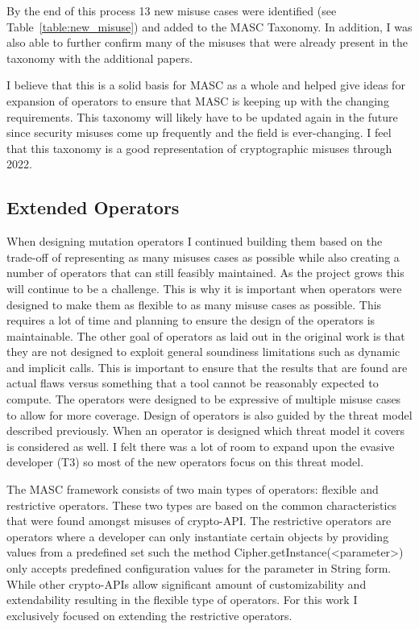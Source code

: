 By the end of this process 13 new misuse cases were identified (see Table~\ref{table:new_misuse}) and added to the MASC Taxonomy. In addition, I was also able to further confirm many of the misuses that were already present in the taxonomy with the additional papers.

I believe that this is a solid basis for MASC as a whole and helped give ideas for expansion of operators to ensure that MASC is keeping up with the changing requirements. This taxonomy will likely have to be updated again in the future since security misuses come up frequently and the field is ever-changing. I feel that this taxonomy is a good representation of cryptographic misuses through 2022.

\subsection{Extended Operators}
\label{ch2:sec:operators}

When designing mutation operators I continued building them based on the trade-off of representing as many misuses cases as possible while also creating a number of operators that can still feasibly maintained. As the project grows this will continue to be a challenge. This is why it is important when operators were designed to make them as flexible to as many misuse cases as possible. This requires a lot of time and planning to ensure the design of the operators is maintainable. The other goal of operators as laid out in the original work is that they are not designed to exploit general soundiness limitations such as dynamic and implicit calls. This is important to ensure that the results that are found are actual flaws versus something that a tool cannot be reasonably expected to compute. The operators were designed to be expressive of multiple misuse cases to allow for more coverage. Design of operators is also guided by the threat model described previously. When an operator is designed which threat model it covers is considered as well. I felt there was a lot of room to expand upon the evasive developer (T3) so most of the new operators focus on this threat model.

The MASC framework consists of two main types of operators: flexible and restrictive operators. These two types are based on the common characteristics that were found amongst misuses of crypto-API. The restrictive operators are operators where a developer can only instantiate certain objects by providing values from a predefined set such the method Cipher.getInstance(<parameter>) only accepts predefined configuration values for the parameter in String form. While other crypto-APIs allow significant amount of customizability and extendability resulting in the flexible type of operators. For this work I exclusively focused on extending the restrictive operators.

